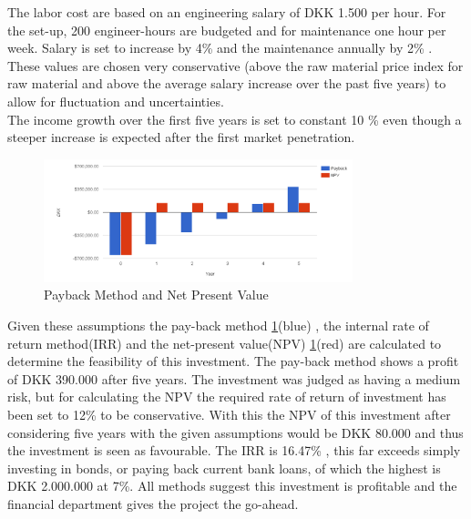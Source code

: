 The labor cost are based on an engineering salary of DKK 1.500 per hour. For the set-up, 200 engineer-hours are budgeted and for maintenance one hour per week. Salary is set to increase by 4\% and the maintenance annually by 2\% . These values are chosen very conservative (above the raw material price index for raw material and above the average salary increase over the past five years) to allow for fluctuation and uncertainties. \\ The income growth over the first five years is set to constant 10 \% even though a steeper increase is expected after the first market penetration.\\
    \begin{figure}[h]
        \centering
        \includegraphics[width=0.8\textwidth]{figs/pb_npv}
        \caption{Payback Method and Net Present Value}
        \label{fig:payback_npv}
    \end{figure}

Given these assumptions the pay-back method \ref{fig:payback_npv}(blue) , the internal rate of return method(IRR) and the net-present value(NPV) \ref{fig:payback_npv}(red) are calculated to determine the feasibility of this investment.
The pay-back method shows a profit of DKK 390.000 after five years. The investment was judged as having a medium risk, but for calculating the NPV the required rate of return of investment has been set to 12\% to be conservative. With this the NPV of this investment after considering five years with the given assumptions would be DKK 80.000 and thus the investment is seen as favourable. The IRR is 16.47\% , this far exceeds simply investing in bonds, or paying back current bank loans, of which the highest is DKK 2.000.000 at 7\%.
All methods suggest this investment is profitable and the financial department gives the project the go-ahead.

